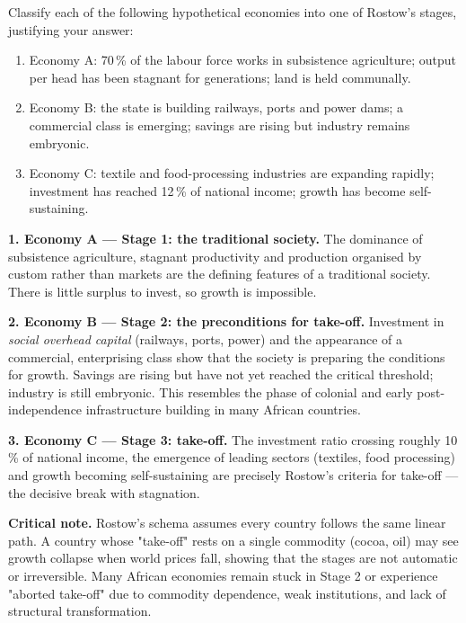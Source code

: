 \documentclass[11pt]{article}
\newcommand{\cle}[1]{{\popxbold\color{popdark}#1}}
\begin{document}
\begin{exoresolu}
Classify each of the following hypothetical economies into one of Rostow's stages, justifying your answer:
\begin{enumerate}
\item Economy A: 70\,\% of the labour force works in subsistence agriculture; output per head has been stagnant for generations; land is held communally.
\item Economy B: the state is building railways, ports and power dams; a commercial class is emerging; savings are rising but industry remains embryonic.
\item Economy C: textile and food-processing industries are expanding rapidly; investment has reached 12\,\% of national income; growth has become self-sustaining.
\end{enumerate}
\tcblower
\textbf{1. Economy A — Stage 1: the traditional society.} The dominance of subsistence agriculture, stagnant productivity and production organised by custom rather than markets are the defining features of a traditional society. There is little surplus to invest, so growth is impossible.

\textbf{2. Economy B — Stage 2: the preconditions for take-off.} Investment in \emph{social overhead capital} (railways, ports, power) and the appearance of a commercial, enterprising class show that the society is preparing the conditions for growth. Savings are rising but have not yet reached the critical threshold; industry is still embryonic. This resembles the phase of colonial and early post-independence infrastructure building in many African countries.

\textbf{3. Economy C — Stage 3: take-off.} The investment ratio crossing roughly 10\,\% of national income, the emergence of \cle{leading sectors} (textiles, food processing) and growth becoming self-sustaining are precisely Rostow's criteria for take-off — the decisive break with stagnation.

\textbf{Critical note.} Rostow's schema assumes every country follows the same linear path. A country whose "take-off" rests on a single commodity (cocoa, oil) may see growth collapse when world prices fall, showing that the stages are not automatic or irreversible. Many African economies remain stuck in Stage 2 or experience "aborted take-off" due to commodity dependence, weak institutions, and lack of structural transformation.
\end{exoresolu}
\end{document}
